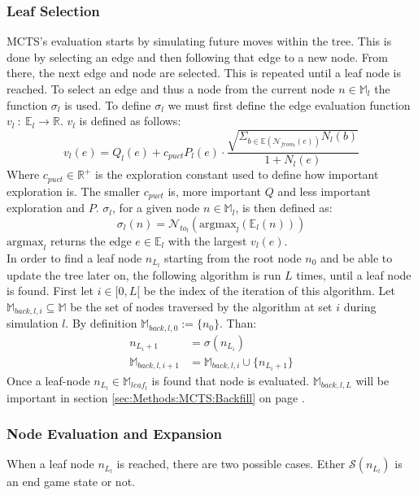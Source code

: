 \documentclass[12pt]{article}
\newcommand{\sectionref}[1]{section \ref{#1} on page \pageref{#1}}
\begin{document}
\subsubsection{Leaf Selection} \label{sec:Methods:MCTS:Leaf_selection}
MCTS's evaluation starts by simulating future moves within the tree. This is done by selecting an edge and then following that edge to a new node. From there, the next edge and node are selected. This is repeated until a leaf node is reached. To select an edge and thus a node from the current node \(n\in \mathbb{M}_l\) the function \(\sigma_l\) is used. To define \(\sigma_l\) we must first define the edge evaluation function \(v_l~:~\mathbb{E}_{l}\to\mathbb{R}\). \(v_l\) is defined as follows:
\begin{equation}
v_l(e) = Q_l(e) + c_{puct}P_l(e)\cdot\frac{\sqrt{\Sigma_{b\in\mathbb{E}(\mathcal{N}_{from_l}(e))}N_l(b)}}{1+N_l(e)}
\end{equation}
Where \(c_{puct}\in \mathbb{R}^+\) is the exploration constant used to define how important exploration is. The smaller \(c_{puct}\) is, more important \(Q\) and less important exploration and \(P\). \(\sigma_l\), for a given node \(n\in\mathbb{M}_l\), is then defined as:
\begin{equation}\label{eq:sigma}
\sigma_l(n) = \mathcal{N}_{to_l}(\text{argmax}_l(\mathbb{E}_l(n)))
\end{equation}
\(\text{argmax}_l\) returns the edge \(e \in\mathbb E_l\) with the largest \(v_l(e)\).\\
In order to find a leaf node \(n_{L_l}\) starting from the root node \(n_{0}\) and be able to update the tree later on, the following algorithm is run \(L\) times, until a leaf node is found. First let \(i \in [0,L[\) be the index of the iteration of this algorithm. Let \(\mathbb M_{back,l,i} \subseteq \mathbb M\) be the set of nodes traversed by the algorithm at set \(i\) during simulation \(l\). By definition \(\mathbb M_{back,l,0} := \{n_0\}\). Than:
\begin{align}
n_{L_i+1} &= \sigma (n_{L_i})\\
\mathbb M_{back,l,i+1} &= \mathbb M_{back,l,i} \cup \{n_{L_i+1}\}
\end{align}
Once a leaf-node \(n_{L_l}\in\mathbb{M}_{leaf_l}\) is found that node is evaluated. \(\mathbb M_{back,l,L}\) will be important in \sectionref{sec:Methods:MCTS:Backfill}.


\subsubsection{Node Evaluation and Expansion}
\label{sec:Methods:MCTS:Node Evaluation and Expansion}
When a leaf node \(n_{L_l}\) is reached, there are two possible cases. Ether \(\mathcal S(n_{L_l})\) is an end game state or not.
\end{document}
